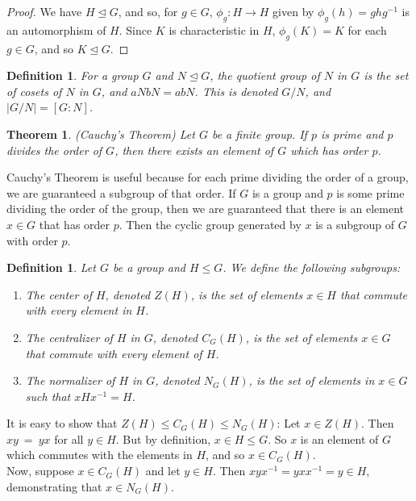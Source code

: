 \documentclass[12pt]{report}
\theoremstyle{newthm}
\newtheorem{Theorem}[lem]{Theorem}
\newtheorem{Definition}[lem]{Definition}
\begin{document}
\begin{proof} We have $H\trianglelefteq G$, and so, for $g\in G$, $\phi_g: H \rightarrow H$ given by $\phi_g(h)=ghg^{-1}$ is an automorphism of $H$. Since $K$ is characteristic in $H$, $\phi_g(K)=K$ for each $g\in G$, and so $K\trianglelefteq G.$
\end{proof}

\begin{Definition}
For a group $G$ and $N\trianglelefteq G$, the \textit{quotient group} of $N$ in $G$ is the set of cosets of $N$ in $G$, and $aNbN=abN$. This is denoted $G/N$, and $|G/N|=[G:N]$.
\end{Definition}

\begin{Theorem}(Cauchy's Theorem) Let $G$ be a finite group. If $p$ is prime and $p$ divides the order of $G$, then there exists an element of $G$ which has order $p$.
\end{Theorem}

Cauchy's Theorem is useful because for each prime dividing the order of a group, we are guaranteed a subgroup of that order. If $G$ is a group and $p$ is some prime dividing the order of the group, then we are guaranteed that there is an element $x\in G$ that has order $p$. Then the cyclic group generated by $x$ is a subgroup of $G$ with order $p$.

\begin{Definition} Let $G$ be a group and $H\leq G$. We define the following subgroups:\\
{\singlespacing
\begin{enumerate}[nosep]
    \item The \textit{center} of $H$, denoted $Z(H)$, is the set of elements $x\in H$ that commute with every element in $H$.
    \item The \textit{centralizer} of $H$ in $G$, denoted $C_G(H)$, is the set of elements $x\in G$ that commute with every element of $H$. 
    \item The \textit{normalizer} of $H$ in $G$, denoted $N_G(H)$, is the set of elements in $x\in G$ such that $xHx^{-1}=H$.
\end{enumerate}
}
\end{Definition}

It is easy to show that $Z(H)\leq C_G(H)\leq N_G(H)$: Let $x\in Z(H)$. Then $xy~=~yx$ for all $y\in H$. But by definition, $x\in H\leq G$. So $x$ is an element of $G$ which commutes with the elements in $H$, and so $x\in C_G(H)$. \\Now, suppose $x\in C_G(H)$ and let $y\in H$. Then $xyx^{-1}=yxx^{-1}=y\in H$, demonstrating that $x\in N_G(H)$.
\end{document}
